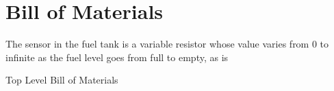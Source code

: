 \chapter{Bill of Materials}

The sensor in the fuel tank is a variable resistor whose value varies from 0 to infinite as the fuel level goes from full to empty, as is 

\begin{table}
\caption{Top Level Bill of Materials}
\label{tab:toplevelbom}
\vspace{10pt}
\centering
{}

\par
\end{table}

